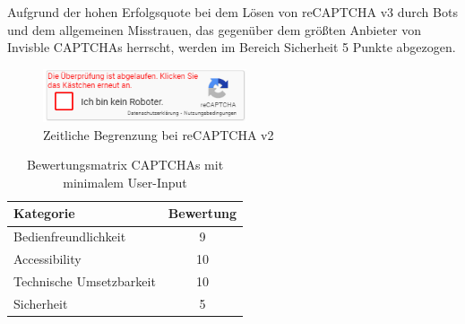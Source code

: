 Aufgrund der hohen Erfolgsquote bei dem Lösen von reCAPTCHA v3 durch Bots 
und dem allgemeinen Misstrauen, das gegenüber dem größten Anbieter von Invisble CAPTCHAs herrscht, 
werden im Bereich Sicherheit 5 Punkte abgezogen.

\begin{figure}[h!]
    \centering\includegraphics[width=6cm]{gfx/mygraphics/recaptchaabgelaufen.png}
     \caption{Zeitliche Begrenzung bei reCAPTCHA v2}
      \label{fig:recaptchaabgelaufen}
\end{figure}

\begin{table}[h!]
    \caption{Bewertungsmatrix CAPTCHAs mit minimalem User-Input}
    \begin{center}
        \begin{tabular}{l|c}
            Kategorie                       & Bewertung \\\hline
            Bedienfreundlichkeit            & 9         \\
            Accessibility                   & 10        \\
            Technische Umsetzbarkeit        & 10         \\
            Sicherheit                      & 5         
        \end{tabular}
    \end{center}
\end{table}